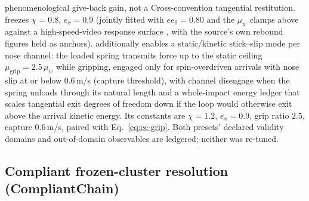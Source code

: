 phenomenological give-back gain, not a Cross-convention tangential
restitution.  freezes $\chi = 0.8$,
$e_x = 0.9$ (jointly fitted with $ee_0 = 0.80$ and the $\mu_w$ clamps
above against a high-speed-video response surface
\citep{alciatore_hsv_catalog}, with the source's own rebound figures
held as anchors).  additionally enables a
static/kinetic stick--slip mode per nose channel: the loaded spring
transmits force up to the static ceiling
$\mu_{\mathrm{grip}} = 2.5\,\mu_w$ while gripping, engaged only for
spin-overdriven arrivals with nose slip at or below
$0.6$\,m/s (capture threshold), with channel disengage when the spring
unloads through its natural length and a whole-impact energy ledger
that scales tangential exit degrees of freedom down if the loop would
otherwise exit above the arrival kinetic energy. Its constants are
$\chi = 1.2$, $e_x = 0.9$, grip ratio $2.5$, capture $0.6$\,m/s,
paired with Eq.~\eqref{eq:ec-grip}. Both presets' declared validity
domains and out-of-domain observables are ledgered;
neither was re-tuned.

\subsection{Compliant frozen-cluster resolution (CompliantChain)}
\label{sec:appendix-eq-cluster}


